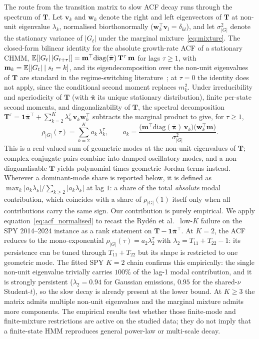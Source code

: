 The route from the transition matrix to slow ACF decay runs through the spectrum of $\mathbf T$. Let $\mathbf v_k$ and $\mathbf w_k$ denote the right and left eigenvectors of $\mathbf T$ at non-unit eigenvalue $\lambda_k$, normalised biorthonormally ($\mathbf w_k^\top \mathbf v_l = \delta_{kl}$), and let $\sigma_{|G|}^2$ denote the stationary variance of $|G_t|$ under the marginal mixture~\eqref{eq:mixture}. The closed-form bilinear identity for the absolute growth-rate ACF of a stationary CHMM, $\mathbb{E}[|G_t|\,|G_{t+\tau}|] = \mathbf m^\top \mathrm{diag}(\bar{\boldsymbol\pi})\,\mathbf T^\tau\,\mathbf m$ for lags $\tau \ge 1$, with $\mathbf m_k = \mathbb{E}[|G_t| \mid s_t = k]$, and its eigendecomposition over the non-unit eigenvalues of $\mathbf T$ are standard in the regime-switching literature~\cite{hamilton1994time, timmermann2000moments}; at $\tau = 0$ the identity does not apply, since the conditional second moment replaces $m_k^2$. Under irreducibility and aperiodicity of $\mathbf T$ (with $\bar{\boldsymbol\pi}$ its unique stationary distribution), finite per-state second moments, and diagonalizability of $\mathbf T$, the spectral decomposition $\mathbf T^\tau = \mathbf 1\bar{\boldsymbol\pi}^\top + \sum_{k=2}^K \lambda_k^\tau\, \mathbf v_k \mathbf w_k^\top$ subtracts the marginal product to give, for $\tau \ge 1$,
\begin{equation}
    \rho_{|G|}(\tau) = \sum_{k=2}^{K} a_k\, \lambda_k^{\tau},
    \qquad
    a_k = \frac{\big(\mathbf m^\top \mathrm{diag}(\bar{\boldsymbol\pi})\, \mathbf v_k\big)\big(\mathbf w_k^\top \mathbf m\big)}{\sigma_{|G|}^2}.
    \label{eq:acf_normalised}
\end{equation}
This is a real-valued sum of geometric modes at the non-unit eigenvalues of $\mathbf T$; complex-conjugate pairs combine into damped oscillatory modes, and a non-diagonalisable $\mathbf T$ yields polynomial-times-geometric Jordan terms instead. Wherever a dominant-mode share is reported below, it is defined as $\max_k |a_k \lambda_k| / \sum_{k \ge 2} |a_k \lambda_k|$ at lag $1$: a share of the total \emph{absolute} modal contribution, which coincides with a share of $\rho_{|G|}(1)$ itself only when all contributions carry the same sign. Our contribution is purely empirical. We apply equation~\eqref{eq:acf_normalised} to recast the Ryd\'{e}n et al.~\cite{ryden1998stylized} low-$K$ failure on the SPY 2014--2024 instance as a rank statement on $\mathbf T - \mathbf 1\bar{\boldsymbol\pi}^\top$. At $K = 2$, the ACF reduces to the mono-exponential $\rho_{|G|}(\tau) = a_2\lambda_2^\tau$ with $\lambda_2 = T_{11} + T_{22} - 1$: its persistence can be tuned through $T_{11} + T_{22}$ but its shape is restricted to one geometric mode. The fitted SPY $K = 2$ chain confirms this empirically: the single non-unit eigenvalue trivially carries $100\%$ of the lag-1 modal contribution, and it is strongly persistent ($\lambda_2 = 0.94$ for Gaussian emissions, $0.95$ for the shared-$\nu$ Student-$t$), so the slow decay is already present at the lower bound. At $K \ge 3$ the matrix admits multiple non-unit eigenvalues and the marginal mixture admits more components. The empirical results test whether those finite-mode and finite-mixture restrictions are active on the studied data; they do not imply that a finite-state HMM reproduces general power-law or multi-scale decay.
